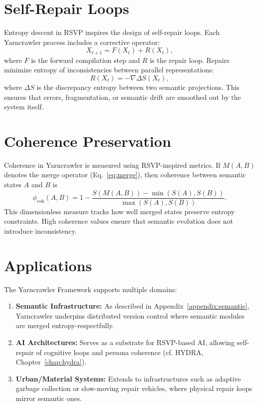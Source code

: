 \documentclass[12pt]{report}
\begin{document}
\section{Self-Repair Loops}

Entropy descent in RSVP inspires the design of self-repair loops. Each Yarncrawler process includes a corrective operator:
\[
X_{t+1} = F(X_t) + R(X_t),
\]
where $F$ is the forward compilation step and $R$ is the repair loop.  
Repairs minimize entropy of inconsistencies between parallel representations:
\[
R(X_t) = - \nabla \Delta S(X_t),
\]
where $\Delta S$ is the discrepancy entropy between two semantic projections.  
This ensures that errors, fragmentation, or semantic drift are smoothed out by the system itself.

\section{Coherence Preservation}

Coherence in Yarncrawler is measured using RSVP-inspired metrics. If $M(A,B)$ denotes the merge operator (Eq.~\ref{eq:merge}), then coherence between semantic states $A$ and $B$ is
\[
\phi_{\text{coh}}(A,B) = 1 - \frac{S(M(A,B)) - \min(S(A),S(B))}{\max(S(A),S(B))}.
\]
This dimensionless measure tracks how well merged states preserve entropy constraints.  
High coherence values ensure that semantic evolution does not introduce inconsistency.

\section{Applications}

The Yarncrawler Framework supports multiple domains:

\begin{enumerate}
    \item \textbf{Semantic Infrastructure:} As described in Appendix~\ref{appendix:semantic}, Yarncrawler underpins distributed version control where semantic modules are merged entropy-respectfully.  
    \item \textbf{AI Architectures:} Serves as a substrate for RSVP-based AI, allowing self-repair of cognitive loops and persona coherence (cf. HYDRA, Chapter~\ref{chap:hydra}).  
    \item \textbf{Urban/Material Systems:} Extends to infrastructures such as adaptive garbage collection or slow-moving repair vehicles, where physical repair loops mirror semantic ones.  
\end{enumerate}
\end{document}
